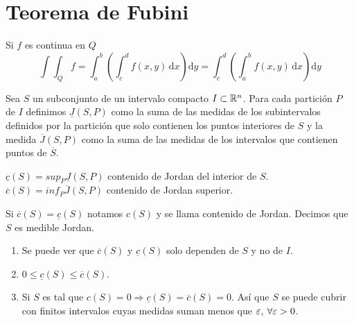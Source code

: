 \section{Teorema de Fubini}
\begin{corollary}[Fubini]
  Si $f$ es continua en $Q$ \begin{equation}
    \int\int_Q f = \int_a^b(\int_c^d f(x, y) \, \mathrm{d}x) \mathrm{d}y = \int_c^d(\int_a^b f(x, y)\, \mathrm{d}x)\mathrm{d}y
  \end{equation}
\end{corollary}

\begin{definition}
  Sea $S$ un subconjunto de un intervalo compacto $I \subset \mathbb{R}^n$. Para cada partición $P$ de $I$ definimos $\underline{J}(S, P)$ como la suma de las medidas de los subintervalos definidos por la partición que solo contienen los puntos interiores de $S$ y la medida $\overline{J}(S, P)$ como la suma de las medidas de los intervalos que contienen puntos de $\overline{S}$.
\end{definition}

\begin{definition}
  $\underline{c}(S) = sup_P \underline{J}(S, P)$ contenido de Jordan del interior de $S$.
  $\overline{c}(S) = inf_P \overline{J}(S, P)$ contenido de Jordan superior.
\end{definition}

\clearpage

\begin{definition}
  Si $\overline{c}(S) = \underline{c}(S)$ notamos $c(S)$ y se llama contenido de Jordan. Decimos que $S$ es medible Jordan.
\end{definition}

\begin{note}
  \begin{enumerate}
    \item Se puede ver que $\overline{c}(S)$ y $\underline{c}(S)$ solo dependen de $S$ y no de $I$.
    \item $0 \leq \underline{c}(S) \leq \overline{c}(S)$.
    \item Si $S$ es tal que $c(S) = 0 \Rightarrow \underline{c}(S) = \overline{c}(S) = 0$. Así que $S$ se puede cubrir con finitos intervalos cuyas medidas suman menos que $\varepsilon$, $\forall \varepsilon > 0$.
  \end{enumerate}
\end{note}
